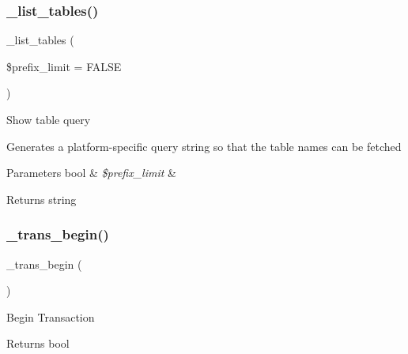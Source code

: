 \subsubsection{\texorpdfstring{\+\_\+list\+\_\+tables()}{\_list\_tables()}}
{\footnotesize\ttfamily \+\_\+list\+\_\+tables (\begin{DoxyParamCaption}\item[{}]{\$prefix\+\_\+limit = {\ttfamily FALSE} }\end{DoxyParamCaption})\hspace{0.3cm}{\ttfamily [protected]}}

Show table query

Generates a platform-\/specific query string so that the table names can be fetched


\begin{DoxyParams}[1]{Parameters}
bool & {\em \$prefix\+\_\+limit} & \\
\hline
\end{DoxyParams}
\begin{DoxyReturn}{Returns}
string 
\end{DoxyReturn}
\mbox{\label{class_c_i___d_b__oci8__driver_ac81ac882c1d54347d810199a15856aac}} 
\subsubsection{\texorpdfstring{\+\_\+trans\+\_\+begin()}{\_trans\_begin()}}
{\footnotesize\ttfamily \+\_\+trans\+\_\+begin (\begin{DoxyParamCaption}{ }\end{DoxyParamCaption})\hspace{0.3cm}{\ttfamily [protected]}}

Begin Transaction

\begin{DoxyReturn}{Returns}
bool 
\end{DoxyReturn}
\mbox{\label{class_c_i___d_b__oci8__driver_a6fe7f373e0b11cfae23a5f41c0b35dda}} 
